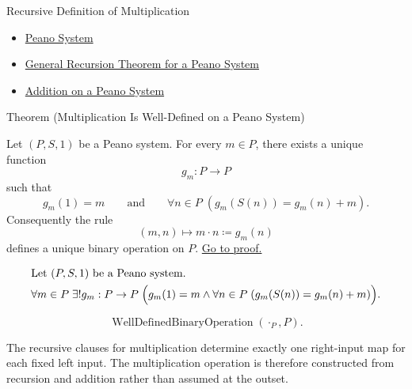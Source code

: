 \begin{topicbox}{Recursive Definition of Multiplication}
\begin{dependencies}
\begin{itemize}
  \item \hyperref[def:peano-system]{Peano System}
  \item \hyperref[thm:general-recursion-theorem-for-peano-system]{General Recursion Theorem for a Peano System}
  \item \hyperref[def:addition-on-peano-system]{Addition on a Peano System}
\end{itemize}
\end{dependencies}

\begin{theorembox}{Theorem (Multiplication Is Well-Defined on a Peano System)}
\begin{theorem}
\label{thm:multiplication-well-defined-on-peano-system}
Let $(P,S,1)$ be a Peano system. For every $m \in P$, there exists a unique
function
\[
g_m : P \to P
\]
such that
\[
g_m(1)=m
\qquad\text{and}\qquad
\forall n \in P\;(g_m(S(n))=g_m(n)+m).
\]
Consequently the rule
\[
(m,n) \longmapsto m \cdot n \coloneqq g_m(n)
\]
defines a unique binary operation on $P$.
\hyperref[prf:multiplication-well-defined-on-peano-system]{Go to proof.}
\end{theorem}
\end{theorembox}

\begin{remark*}
\[
\begin{aligned}
&\text{Let } (P,S,1) \text{ be a Peano system.}\\
&\forall m \in P\;\exists! g_m : P \to P\;
\Bigl(g_m(1)=m \land
\forall n \in P\;(g_m(S(n))=g_m(n)+m)\Bigr).
\end{aligned}
\]
\end{remark*}

\begin{remark*}
\[
\operatorname{WellDefinedBinaryOperation}(\cdot_P,P).
\]
\end{remark*}

\begin{remark*}[Interpretation]
The recursive clauses for multiplication determine exactly one right-input map
for each fixed left input. The multiplication operation is therefore
constructed from recursion and addition rather than assumed at the outset.



\end{remark*}
\end{topicbox}
